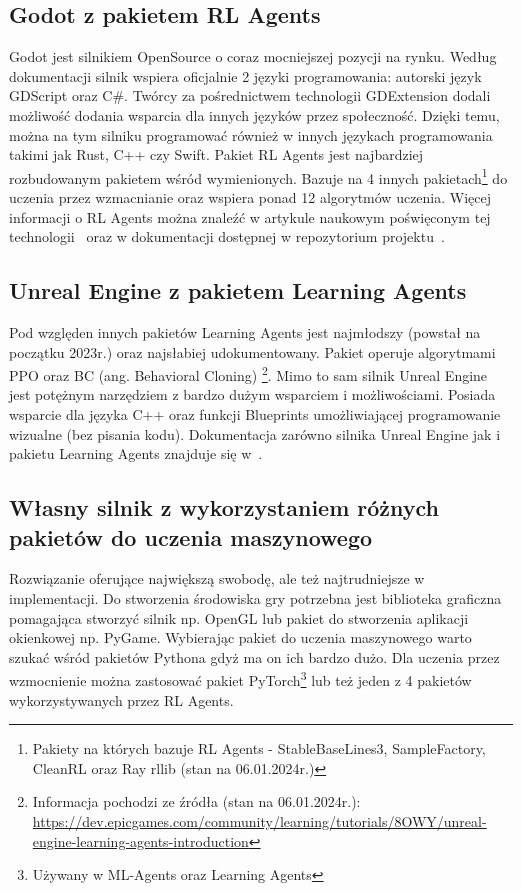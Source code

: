 \documentclass{SGGW-thesis}
\begin{document}
\subsection{Godot z pakietem RL Agents}
Godot jest silnikiem OpenSource o coraz mocniejszej pozycji na rynku. Według dokumentacji\cite{GodotDocs}
silnik wspiera oficjalnie 2 języki programowania: autorski język GDScript oraz C\#. Twórcy za pośrednictwem technologii GDExtension dodali możliwość dodania wsparcia dla innych języków przez społeczność.
Dzięki temu, można na tym silniku programować również w innych językach programowania takimi jak Rust, C++ czy Swift. Pakiet RL Agents jest najbardziej rozbudowanym pakietem wśród wymienionych.
Bazuje na 4 innych pakietach\footnote{Pakiety na których bazuje RL Agents - StableBaseLines3, SampleFactory, CleanRL oraz Ray rllib (stan na 06.01.2024r.)} do uczenia przez wzmacnianie
oraz wspiera ponad 12 algorytmów uczenia. Więcej informacji o RL Agents można znaleźć w artykule naukowym poświęconym tej technologii~\cite{GodotRLAgentsArticle} oraz w dokumentacji dostępnej w repozytorium projektu~\cite{GodotRLAgentsDocs}.
\subsection{Unreal Engine z pakietem Learning Agents}
Pod względen innych pakietów Learning Agents jest najmłodszy (powstał na początku 2023r.) oraz najsłabiej udokumentowany. Pakiet operuje algorytmami PPO oraz BC (ang. Behavioral Cloning) \footnote{Informacja pochodzi ze źródła (stan na 06.01.2024r.): \url{https://dev.epicgames.com/community/learning/tutorials/8OWY/unreal-engine-learning-agents-introduction}}. 
Mimo to sam silnik Unreal Engine jest potężnym narzędziem z bardzo dużym wsparciem i możliwościami. Posiada wsparcie dla języka C++ oraz funkcji Blueprints umożliwiającej programowanie wizualne (bez pisania kodu). 
Dokumentacja zarówno silnika Unreal Engine jak i pakietu Learning Agents znajduje się w~\cite{UnrealDocs}.
\subsection{Własny silnik z wykorzystaniem różnych pakietów do uczenia maszynowego}
Rozwiązanie oferujące największą swobodę, ale też najtrudniejsze w implementacji. Do stworzenia środowiska gry potrzebna jest biblioteka graficzna pomagająca stworzyć silnik np. OpenGL
lub pakiet do stworzenia aplikacji okienkowej np. PyGame. Wybierając pakiet do uczenia maszynowego warto szukać wśród pakietów Pythona gdyż ma on ich bardzo dużo. Dla uczenia przez wzmocnienie można zastosować pakiet PyTorch\footnote{Używany w ML-Agents oraz Learning Agents}
lub też jeden z 4 pakietów wykorzystywanych przez RL Agents.
\end{document}
